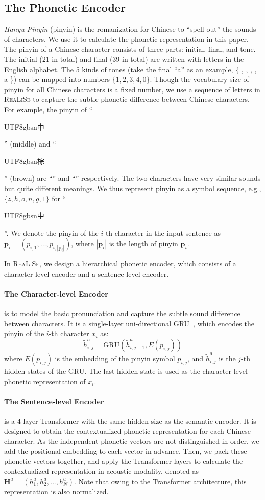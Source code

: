 \documentclass[11pt,a4paper]{article}
\newcommand\model{\textsc{ReaLiSe}}
\newcommand{\cjksong}[1]{{{\begin{CJK*}{UTF8}{gbsn}#1\end{CJK*}}}}
\begin{document}
\subsection{The Phonetic Encoder}
\textit{Hanyu Pinyin} (pinyin) is the romanization for Chinese to ``spell out'' the sounds of characters.
We use it to calculate the phonetic representation in this paper. The pinyin of a Chinese character consists of three parts: initial, final, and tone. The initial (21 in total) and final (39 in total) are written with letters in the English alphabet. The 5 kinds of tones (take the final ``a'' as an example, \{ , , , , a \}) can be mapped into numbers $\{1,2,3,4,0\}$.
Though the vocabulary size of pinyin for all Chinese characters is a fixed number, we use a sequence of letters in \model{} to capture the subtle phonetic difference between Chinese characters.
For example, the pinyin of ``\cjksong{中}'' (middle) and ``\cjksong{棕}'' (brown) are ``'' and ``'' respectively. The two characters have very similar sounds but quite different meanings. 
We thus represent pinyin as a symbol sequence, e.g., $\{z, h, o, n, g, 1\}$ for ``\cjksong{中}''. 
We denote the pinyin of the $i$-th character in the input sentence as $\bm{p}_i = (p_{i,1}, \dots, p_{i,|\bm{p}_i|})$, where $|\bm{p}_i|$ is the length of pinyin $\bm{p}_i$.

In \model{}, we design a hierarchical phonetic encoder, which consists of a character-level encoder and a sentence-level encoder.

\paragraph{The Character-level Encoder} is to model the basic pronunciation and capture the subtle sound difference between characters. It is a single-layer uni-directional GRU~\citep{gru}, which encodes the pinyin of the $i$-th character $x_i$ as:
\begin{equation}
    \tilde{h}^a_{i,j} = \textrm{GRU}(\tilde{h}^a_{i, j-1}, E(p_{i,j}))
\end{equation}
where $E(p_{i,j})$ is the embedding of the pinyin symbol $p_{i,j}$, and $\tilde{h}^a_{i,j}$ is the $j$-th hidden states of the GRU. The last hidden state is used as the character-level phonetic representation of   $x_i$. 

\paragraph{The Sentence-level Encoder} is a 4-layer Transformer with the same hidden size as the semantic encoder. It is designed to obtain the contextualized phonetic representation for each Chinese character. As the independent phonetic vectors are not distinguished in order, we add the positional embedding to each vector in advance.
Then, we pack these phonetic vectors together, and apply the Transformer layers to calculate the contextualized representation in acoustic modality, denoted as $\mathbf{H}^a = (h^a_1, h^a_2, ..., h^a_N)$. Note that owing to the Transformer architecture, this representation is also normalized.
\end{document}
